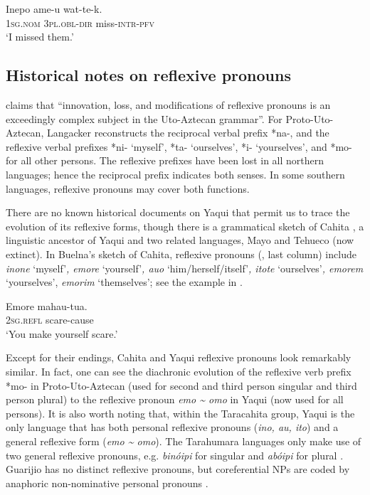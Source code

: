 \documentclass[output=paper]{langscibook}
\begin{document}
\ex
\label{ex:guerrero:10b}
\gll Inepo  ame-u  wat-te-k.\\
  \textsc{1sg.nom}  \textsc{3pl.obl-dir}  miss-\textsc{intr-pfv}\\
\glt ‘I missed them.’
\z
\z



\subsection{Historical notes on reflexive pronouns}\label{sec:guerrero:2.3}


\citet[47]{Langacker1977} claims that “innovation, loss, and modifications of reflexive pronouns is an exceedingly complex subject in the Uto-Aztecan grammar”. For Proto-Uto-Aztecan, Langacker reconstructs the reciprocal verbal prefix *na-, and the reflexive verbal prefixes *ni- ‘myself’, *ta- ‘ourselves’, *i{}- ‘yourselves’, and *mo- for all other persons. The reflexive prefixes have been lost in all northern languages; hence the reciprocal prefix indicates both senses. In some southern languages, reflexive pronouns may cover both functions.



There are no known historical documents on Yaqui that permit us to trace the evolution of its reflexive forms, though there is a grammatical sketch of Cahita \citep{Buelna1890}, a linguistic ancestor of Yaqui and two related languages, Mayo and Tehueco (now extinct). In Buelna’s sketch of Cahita, reflexive pronouns (, last column) include \textit{inone} ‘myself’\textit{, emore} ‘yourself’\textit{, auo} ‘him/herself/itself’\textit{, itote} ‘ourselves’\textit{, emorem} ‘yourselves’, \textit{emorim} ‘themselves’; see the example in .



\ea%
    \label{ex:guerrero:11}
   \gll Emore  mahau-tua.\\
  \textsc{2sg.refl}  scare-cause\\
\glt ‘You make yourself scare.’ \citep[53]{Buelna1890}
\z



Except for their endings, Cahita and Yaqui reflexive pronouns look remarkably similar. In fact, one can see the diachronic evolution of the reflexive verb prefix *mo- in Proto-Uto-Aztecan (used for second and third person singular and third person plural) to the reflexive pronoun \textit{emo {\textasciitilde} omo} in Yaqui (now used for all persons). It is also worth noting that, within the Taracahita group, Yaqui is the only language that has both personal reflexive pronouns (\textit{ino, au, ito}) and a general reflexive form (\textit{emo {\textasciitilde} omo}). The Tarahumara languages only make use of two general reflexive pronouns, e.g. \textit{binóipi} for singular and \textit{abóipi} for plural \citep{Caballero2002}. Guarijio has no distinct reflexive pronouns, but coreferential NPs are coded by anaphoric non-nominative personal pronouns \citep{Felix2005}.
\end{document}
